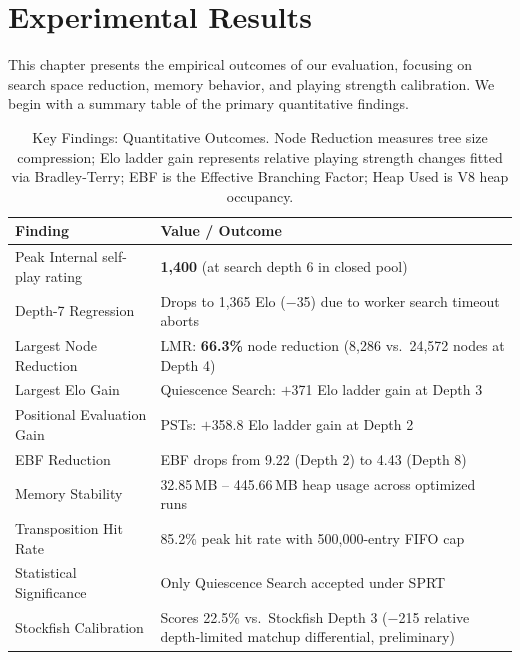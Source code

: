 \chapter{Experimental Results}
\label{ch:experimental_results}

This chapter presents the empirical outcomes of our evaluation, focusing on search space reduction, memory behavior, and playing strength calibration. We begin with a summary table of the primary quantitative findings.

\begin{table}[htbp]
\centering
\caption[Key Findings: Quantitative Outcomes]{Key Findings: Quantitative Outcomes. Node Reduction measures tree size compression; Elo ladder gain represents relative playing strength changes fitted via Bradley-Terry; EBF is the Effective Branching Factor; Heap Used is V8 heap occupancy.}
\label{tab:key_findings}
\begin{tabularx}{\textwidth}{lX}
\toprule
\textbf{Finding} & \textbf{Value / Outcome} \\
\midrule
Peak Internal self-play rating & \textbf{1,400} (at search depth 6 in closed pool) \\
Depth-7 Regression & Drops to 1,365 Elo ($-$35) due to worker search timeout aborts \\
Largest Node Reduction & LMR: \textbf{66.3\%} node reduction (8,286 vs.\ 24,572 nodes at Depth 4) \\
Largest Elo Gain & Quiescence Search: $+$371 Elo ladder gain at Depth 3 \\
Positional Evaluation Gain & PSTs: $+$358.8 Elo ladder gain at Depth 2 \\
EBF Reduction & EBF drops from 9.22 (Depth 2) to 4.43 (Depth 8) \\
Memory Stability & 32.85\,MB -- 445.66\,MB heap usage across optimized runs \\
Transposition Hit Rate & 85.2\% peak hit rate with 500,000-entry FIFO cap \\
Statistical Significance & Only Quiescence Search accepted under SPRT \\
Stockfish Calibration & Scores 22.5\% vs.\ Stockfish Depth 3 ($-$215 relative depth-limited matchup differential, preliminary) \\
\bottomrule
\end{tabularx}
\end{table}



\clearpage


